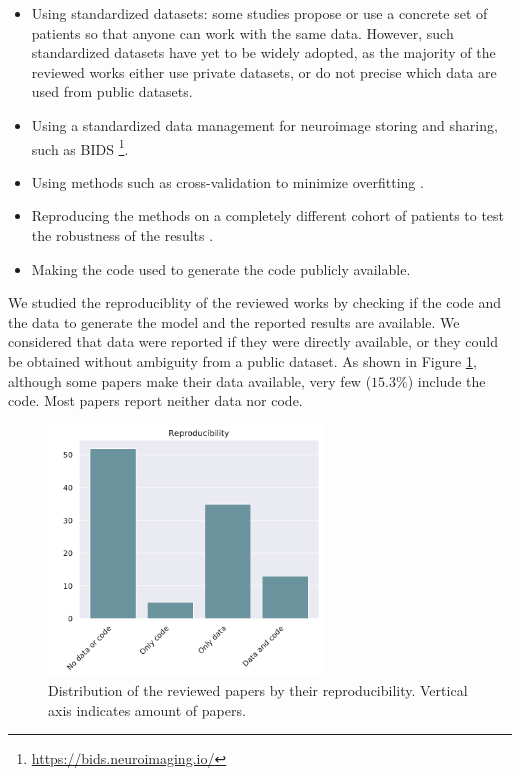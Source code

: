 \begin{itemize}\itemsep7pt
\item Using standardized datasets: some studies \cite{cuingnet,Moradi2015,Sanroma2017,Wyman2013} propose or use a concrete set of patients so that anyone can work with the same data. However, such standardized datasets have yet to be widely adopted, as the majority of the reviewed works either use private datasets, or do not precise which data are used from public datasets.

\item Using a standardized data management for neuroimage storing and sharing, such as BIDS \footnote{\url{https://bids.neuroimaging.io/}}. 

\item Using methods such as cross-validation to minimize overfitting \cite{Yang2018}.

\item Reproducing the methods on a completely different cohort of patients to test the robustness of the results \cite{Casanova2018}.

\item Making the code used to generate the code publicly available.
\end{itemize}

We studied the reproduciblity of the reviewed works by checking if the code and the data to generate the model and the reported results are available. We considered that data were reported if they were directly available, or they could be obtained without ambiguity from a public dataset. As shown in Figure \ref{fig:reproduc}, although some papers make their data available, very few ($15.3 \%$) include the code. Most papers report neither data nor code.  \\

\begin{figure}[!htbp]
\centering
\includegraphics[width=0.65\textwidth]{figures/review/Fig10.pdf}
    \caption[Distribution of the reviewed papers by their reproducibility.]{Distribution of the reviewed papers by their reproducibility. Vertical axis indicates amount of papers.}
    \label{fig:reproduc}
\end{figure}

